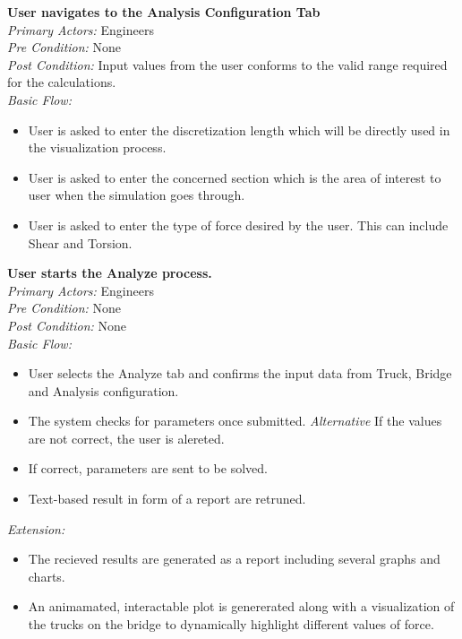\documentclass[12pt]{article}
\begin{document}
\noindent
\textbf{User navigates to the Analysis Configuration Tab} \\
\emph{  Primary Actors:} Engineers\\
\emph{  Pre Condition:} None\\
\emph{  Post Condition:} Input values from the user conforms to the valid range required for the calculations.\\ 
\emph{  Basic Flow:} 
\begin{itemize}
\item User is asked to enter the discretization length which will be directly used in the visualization process. 
\item User is asked to enter the concerned section which is the area of interest to user when the simulation goes through. 
\item User is asked to enter the type of force desired by the user. This can include Shear and Torsion. 
\end{itemize}


\noindent
\textbf{User starts the Analyze process. } \\
\emph{  Primary Actors:} Engineers\\
\emph{  Pre Condition:} None\\
\emph{  Post Condition:} None\\ 
\emph{  Basic Flow:} 
\begin{itemize}
\item User selects the Analyze tab and confirms the input data from Truck, Bridge and Analysis configuration. 
\item The system checks for parameters once submitted.
\subitem \emph{Alternative} If the values are not correct, the user is alereted.
\item If correct, parameters are sent to be solved. 
\item Text-based result in form of a report are retruned.
\end{itemize}
\emph{  Extension:} 
\begin{itemize}
\item The recieved results are generated as a report including several graphs and charts.
\item An animamated, interactable plot is genererated along with a visualization of the trucks on the bridge to dynamically highlight different values of force.
\end{itemize}
\end{document}

